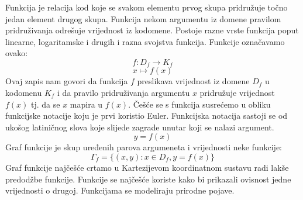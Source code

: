 Funkcija je relacija kod koje se svakom elementu prvog skupa pridružuje točno jedan element drugog skupa.
Funkcija nekom argumentu iz domene pravilom pridruživanja odrešuje vrijednost iz kodomene.
Postoje razne vrste funkcija poput linearne, logaritamske i drugih i razna svojstva funkcija.
Funkcije označavamo ovako:
\[f \colon D_f \to K_f\]
\[x \mapsto f(x)\]
Ovaj zapis nam govori da funkcija \(f\) preslikava vrijednost iz domene \(D_f\) u kodomenu \(K_f\) i da pravilo pridruživanja argumentu \(x\) pridružuje vrijednost \(f(x)\) tj. da se \(x\) mapira u \(f(x)\).
Češće se s funkcija susrećemo u obliku funkcijske notacije koju je prvi koristio Euler.
Funkcijska notacija sastoji se od ukošog latiničnog slova koje slijede zagrade unutar koji se nalazi argument.
\[y = f(x)\]
Graf funkcije je skup uređenih parova argumeneta i vrijednosti neke funkcije:
\[\Gamma_f = \{(x, y) \colon x \in D_f, y = f(x)\}\]
Graf funkcije najčešće crtamo u Kartezijevom koordinatnom sustavu radi lakše predodžbe funkcije.
Funkcije se najčešće koriste kako bi prikazali ovisnost jedne vrijednosti o drugoj.
Funkcijama se modeliraju prirodne pojave.

